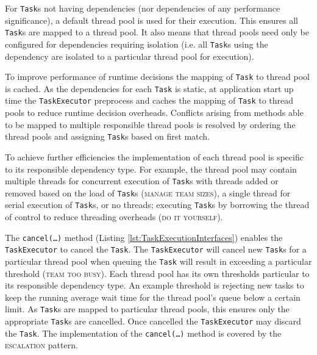 \documentclass[prodmode]{style/acmlarge}
\begin{document}
For \texttt{Task}s not having dependencies (nor dependencies of any performance
significance), a default thread pool is used for their execution.  This ensures
all \texttt{Task}s are mapped to a thread pool.  It also means that thread pools
need only be configured for dependencies requiring isolation (i.e. all
\texttt{Task}s using the dependency are isolated to a particular thread pool for
execution).

To improve performance of runtime decisions the mapping of \texttt{Task} to
thread pool is cached.  As the dependencies for each \texttt{Task} is static, at
application start up time the \texttt{TaskExecutor} preprocess and caches the
mapping of \texttt{Task} to thread pools to reduce runtime decision overheads.
Conflicts arising from methods able to be mapped to multiple responsible thread
pools is resolved by ordering the thread pools and assigning \texttt{Task}s
based on first match.

To achieve further efficiencies the implementation of each thread pool is
specific to its responsible dependency type.  For example, the thread pool may
contain multiple threads for concurrent execution of \texttt{Task}s with threads
added or removed based on the load of \texttt{Task}s (\textsc{manage team
sizes}), a single thread for serial execution of \texttt{Task}s, or no threads;
executing \texttt{Task}s by borrowing the thread of control to reduce threading
overheads (\textsc{do it yourself}).

The \texttt{cancel(\ldots)} method (Listing \ref{lst:TaskExecutionInterfaces})
enables the \texttt{TaskExecutor} to cancel the \texttt{Task}. The
\texttt{Task\-Executor} will cancel new \texttt{Task}s for a particular thread
pool when queuing the \texttt{Task} will result in exceeding a particular
threshold (\textsc{team too busy}).  Each thread pool has its own thresholds
particular to its responsible dependency type.  An example threshold is
rejecting new tasks to keep the running average wait time for the thread pool's
queue below a certain limit.  As \texttt{Task}s are mapped to particular thread
pools, this ensures only the appropriate \texttt{Task}s are cancelled.
Once cancelled the \texttt{TaskExecutor} may discard the \texttt{Task}.  The
implementation of the \texttt{can\-cel(\ldots)} method is covered by the
\textsc{escalation} pattern.
\end{document}
